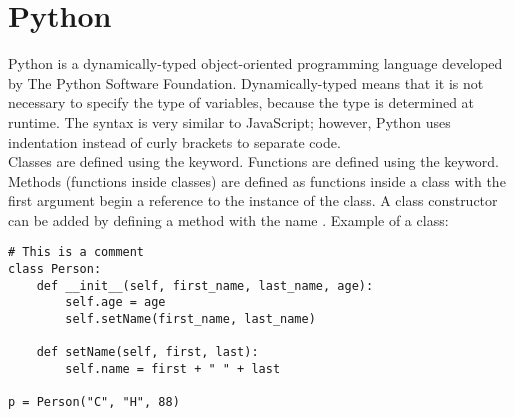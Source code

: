 \section{Python}
Python is a dynamically-typed object-oriented programming language developed by The Python Software Foundation. Dynamically-typed means that it is not necessary to specify the type of variables, because the type is determined at runtime. The syntax is very similar to JavaScript; however, Python uses indentation instead of curly brackets to separate code.
\\[11pt]
Classes are defined using the  keyword. Functions are defined using the  keyword. Methods (functions inside classes) are defined as functions inside a class with the first argument begin a reference to the instance of the class. A class constructor can be added by defining a method with the name . Example of a class:
\begin{lstlisting}
# This is a comment
class Person:
    def __init__(self, first_name, last_name, age):
        self.age = age
        self.setName(first_name, last_name)

    def setName(self, first, last):
        self.name = first + " " + last

p = Person("C", "H", 88)
\end{lstlisting}